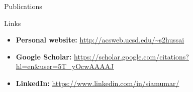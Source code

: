 \begin{cvsection}{Publications}
	\begin{cvsubsection}{}{}{}
        \nocite{*}    
        \begingroup
            \renewcommand{\section}[2]{}%
            
            
        \endgroup
	\end{cvsubsection}
\end{cvsection}

\begin{cvsection}{Links}
	\begin{cvsubsection}{}{}{}	
		\begin{itemize}
			\item \textbf{Personal website:} \url{http://acsweb.ucsd.edu/~s2hussai} 
			\vspace{0.3em}
			\item \textbf{Google Scholar:} \url{https://scholar.google.com/citations?hl=en&user=5T_yOcwAAAAJ} 
			\vspace{0.3em}
			\item \textbf{LinkedIn:} \url{https://www.linkedin.com/in/siamumar/} 
		\end{itemize}
	\end{cvsubsection}
\end{cvsection}